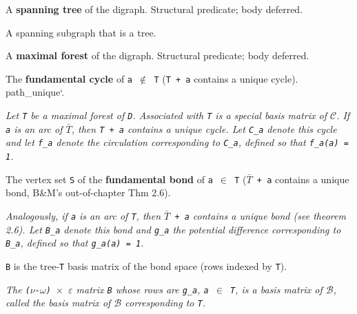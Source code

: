\begin{definition}
\label{CycleSpace.IsSpanningTree}
A \textbf{spanning tree} of the digraph. Structural predicate; body deferred.

A spanning subgraph that is a tree.
\end{definition}

\begin{definition}
\label{CycleSpace.IsMaximalForest}
A \textbf{maximal forest} of the digraph. Structural predicate; body deferred.
\end{definition}

\begin{definition}
\label{CycleSpace.fundamentalCycle}
The \textbf{fundamental cycle} of \texttt{a $\notin$ T} (\texttt{T + a} contains a
unique cycle). path\_unique`.

\emph{Let \texttt{T} be a maximal forest of
\texttt{D}.  Associated with \texttt{T} is a special basis matrix of \texttt{$\mathcal{C}$}.  If \texttt{a} is an arc of
\texttt{$\bar{T}$}, then \texttt{T + a} contains a unique cycle.  Let \texttt{C\_a} denote this cycle and let
\texttt{f\_a} denote the circulation corresponding to \texttt{C\_a}, defined so that \texttt{f\_a(a) = 1}.}
\end{definition}

\begin{definition}
\label{CycleSpace.fundamentalBondVertexSet}
The vertex set \texttt{S} of the \textbf{fundamental bond} of \texttt{a $\in$ T}
(\texttt{$\bar{T}$ + a} contains a unique bond,
B\&M's out-of-chapter Thm 2.6).

\emph{Analogously, if \texttt{a} is an arc of
\texttt{T}, then \texttt{$\bar{T}$ + a} contains a unique bond (see theorem 2.6).  Let \texttt{B\_a} denote this
bond and \texttt{g\_a} the potential difference corresponding to \texttt{B\_a}, defined
so that
\texttt{g\_a(a) = 1}.}
\end{definition}

\begin{definition}
\label{CycleSpace.IsBasisMatrixOfTree}
\texttt{B} is the tree-\texttt{T} basis matrix of the bond space (rows indexed by \texttt{T}).

\emph{The \texttt{($\nu$-$\omega$) $\times$ $\varepsilon$} matrix \texttt{B} whose
rows are \texttt{g\_a}, \texttt{a $\in$ T}, is a basis matrix of \texttt{$\mathcal{B}$},
called the basis matrix of \texttt{$\mathcal{B}$}
corresponding to \texttt{T}.}
\end{definition}

